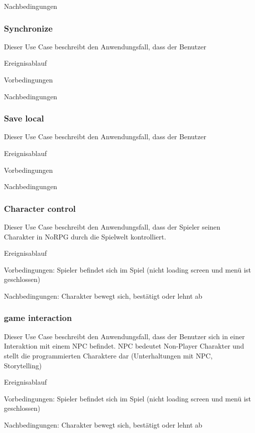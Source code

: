 			{Nachbedingungen
	
		\subsubsection{Synchronize}
			Dieser Use Case beschreibt den Anwendungsfall, dass der Benutzer 
			
			Ereignisablauf
	
			Vorbedingungen
			
			Nachbedingungen
	
		\subsubsection{Save local}
			Dieser Use Case beschreibt den Anwendungsfall, dass der Benutzer 
			
			Ereignisablauf
	
			Vorbedingungen
			
			Nachbedingungen
		
		\subsubsection{Character control}
			Dieser Use Case beschreibt den Anwendungsfall, dass der Spieler seinen Charakter in NoRPG durch die Spielwelt kontrolliert.
			
			Ereignisablauf
			
			Vorbedingungen: Spieler befindet sich im Spiel (nicht loading screen und menü ist geschlossen)
			
			Nachbedingungen: Charakter bewegt sich, bestätigt oder lehnt ab
	
		\subsubsection{game interaction}
			Dieser Use Case beschreibt den Anwendungsfall, dass der Benutzer sich in einer Interaktion mit einem NPC befindet. NPC bedeutet Non-Player Charakter und stellt die programmierten Charaktere dar (Unterhaltungen mit NPC, Storytelling)
			
			Ereignisablauf
			
			Vorbedingungen: Spieler befindet sich im Spiel (nicht loading screen und menü ist geschlossen)
			
			Nachbedingungen: Charakter bewegt sich, bestätigt oder lehnt ab
				
}
